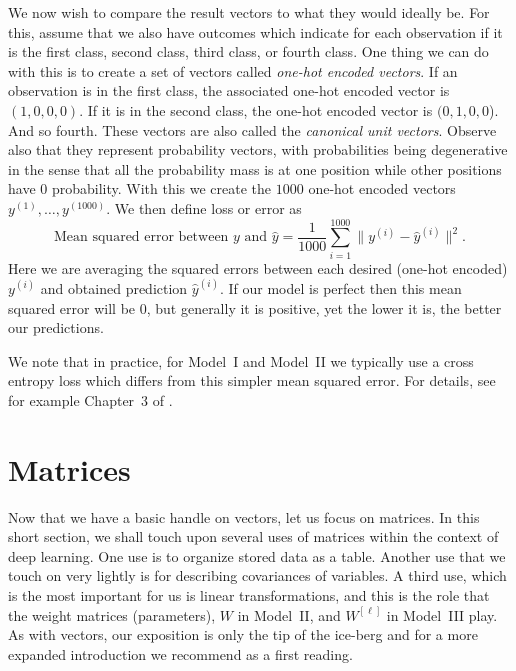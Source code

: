 \documentclass[12pt]{article}
\begin{document}
We now wish to compare the result vectors to what they would ideally be. For this, assume that we also have outcomes which indicate for each observation if it is the first class, second class, third class, or fourth class. One thing we can do with this is to create a set of vectors called {\em one-hot encoded vectors}. If an observation is in the first class, the associated one-hot encoded vector is $(1,0,0,0)$. If it is in the second class, the one-hot encoded vector is $(0,1,0,0$). And so fourth. These vectors are also called the {\em canonical unit vectors}. Observe also that they represent probability vectors, with probabilities being degenerative in the sense that all the probability mass is at one position while other positions have $0$ probability. With this we create the $1000$ one-hot encoded vectors $y^{(1)}, \ldots, y^{(1000)}$. We then define loss or error as
%
\begin{equation}
 \label{eq:mse-error-class-1000}   
\text{Mean squared error between $y$ and $\hat{y}$} = \frac{1}{1000}\sum_{i=1}^{1000} \| y^{(i)} - \hat{y}^{(i)} \|^2.
\end{equation}
%
Here we are averaging the squared errors between each desired (one-hot encoded) $y^{(i)}$ and obtained prediction $\hat{y}^{(i)}$. If our model is perfect then this mean squared error will be $0$, but generally it is positive, yet the lower it is, the better our predictions.

We note that in practice, for Model~I and Model~II we typically use a cross entropy loss which differs from this simpler mean squared error. For details, see for example Chapter~3 of  \cite{LiquetMokaNazarathy2024DeepLearning}.

\section{Matrices}
\label{sec:matrices}
Now that we have a basic handle on vectors, let us focus on matrices. In this short section, we shall touch upon several uses of matrices within the context of deep learning. One use is to organize stored data as a table. Another use that we touch on very lightly is for describing covariances of variables. A third use, which is the most important for us is linear transformations, and this is the role that the weight matrices (parameters), $W$ in Model~II, and $W^{[\ell]}$ in Model~III play. As with vectors, our exposition is only the tip of the ice-berg and for a more expanded introduction we recommend \cite{boyd2018introduction} as a first reading.
\end{document}
